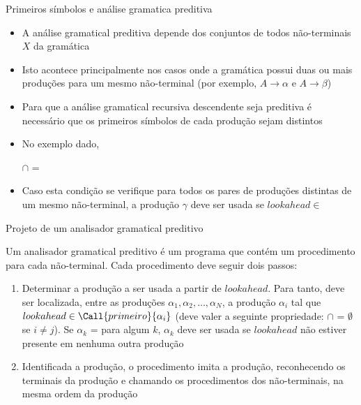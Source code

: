 \begin{frame}[fragile]{Primeiros símbolos e análise gramatica preditiva}

    \begin{itemize}
        \item A análise gramatical preditiva depende dos conjuntos  de todos não-terminais $X$ da gramática

        \item Isto acontece principalmente nos casos onde a gramática possui duas ou mais produções para um mesmo não-terminal (por exemplo, $A \to \alpha$ e
        $A\to \beta$)

        \item Para que a análise gramatical recursiva descendente seja preditiva é necessário que os primeiros símbolos de cada produção sejam distintos

        \item No exemplo dado,

        \begin{center}
         $\cap$  = \emptyset
        \end{center}

        \item Caso esta condição se verifique para todos os pares de produções distintas de um mesmo não-terminal, a produção $\gamma$ deve ser usada se
        $lookahead \in$ 
    \end{itemize}

\end{frame}

\begin{frame}[fragile]{Projeto de um analisador gramatical preditivo}

    Um analisador gramatical preditivo é um programa que contém um procedimento para cada não-terminal. Cada procedimento deve seguir dois passos:

    \begin{enumerate}
        \item Determinar a produção a ser usada a partir de $lookahead$. Para tanto, deve ser localizada, entre as produções $\alpha_1, \alpha_2, \ldots, \alpha_N$,
            a produção $\alpha_i$ tal que $lookahead \in \Call{primeiro}{\alpha_i}$ (deve valer a seguinte propriedade:  $\cap$
             = $\emptyset$ se $i\neq j$). Se $\alpha_k$ =  para algum $k$, $\alpha_k$ deve ser usada se $lookahead$ não estiver
            presente em nenhuma outra produção

        \item Identificada a produção, o procedimento imita a produção, reconhecendo os terminais da produção e chamando os procedimentos dos não-terminais, na
            mesma ordem da produção
    \end{enumerate}

\end{frame}

